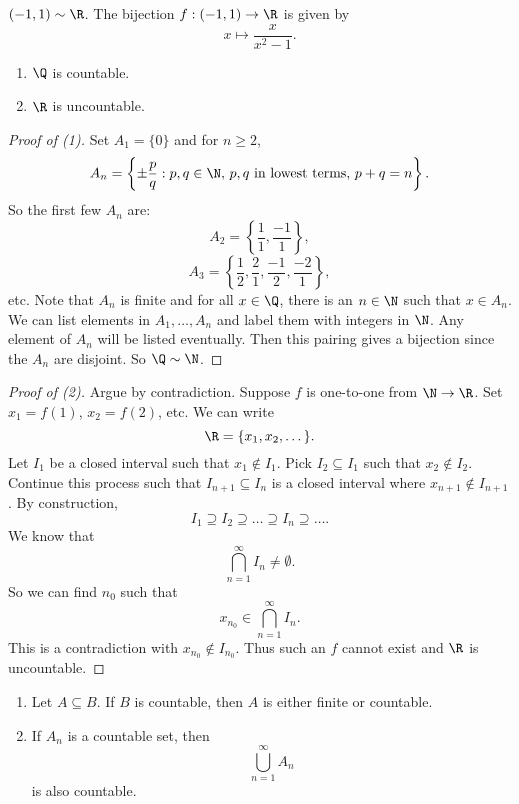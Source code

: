 \begin{example}
  $(-1, 1) \sim \R$.
  The bijection  $f : (-1, 1) \to \R$ is given by
  \[x \mapsto \frac{x}{x^2 - 1}.\]
\end{example}

\begin{theorem}\leavevmode
  \begin{enumerate}
    \item $\Q$ is countable.
    \item  $\R$ is uncountable.
  \end{enumerate}
\end{theorem}

\begin{proof}[Proof of (1)]
  Set $A_1 = \{0\}$ and for $n \ge 2$,
  \[A_n = \left\{\pm \frac{p}{q} : p, q \in \N,\, \text{$p, q$ in lowest terms},\, p + q = n\right\}.\]
  So the first few $A_n$ are:
  \[A_2 = \left\{\frac{1}{1}, \frac{-1}{1}\right\},\]
  \[A_3 = \left\{\frac{1}{2}, \frac{2}{1}, \frac{-1}{2}, \frac{-2}{1}\right\},\]
  etc. Note that $A_n$ is finite and
  for all
  $x \in \Q$, there is an $n \in \N$ such that
  $x \in A_n$.
  We can list elements in $A_1, \dots, A_n$ and label
  them with
  integers in $\N$. Any element of $A_n$ will be
  listed eventually. Then this pairing gives
  a bijection since the $A_n$ are disjoint.
  So $\Q \sim \N$.
\end{proof}

\begin{proof}[Proof of (2)]
  Argue by contradiction. Suppose $f$ is one-to-one from
  $\N \to \R$.
  Set $x_1 = f(1)$, $x_2 = f(2)$, etc. We can write
  \[\R = \{x_1, x_2, \dots\}.\]
  Let $I_1$ be a closed interval such that
  $x_1 \notin I_1$. Pick $I_2 \subseteq I_1$ such that
  $x_2 \notin I_2$. Continue this process such that
  $I_{n+1} \subseteq I_n$ is a closed interval where
  $x_{n+1} \notin I_{n+1}$.
  By construction,
  \[I_1 \supseteq I_2 \supseteq \dots \supseteq I_n \supseteq \dots.\]
  We know that
  \[\bigcap_{n = 1}^\infty I_n \ne \emptyset.\]
  So we can find $n_0$ such that
  \[x_{n_0} \in \bigcap_{n = 1}^\infty I_n.\]
  This is a contradiction with $x_{n_0} \notin I_{n_0}$.
  Thus such an $f$ cannot exist and $\R$ is
  uncountable.
\end{proof}

\begin{theorem}\leavevmode
  \begin{enumerate}
    \item Let $A \subseteq B$. If $B$ is countable, then
      $A$ is either finite or countable.
    \item If $A_n$ is a countable set, then
      \[\bigcup_{n=1}^\infty A_n\]
      is also countable.
  \end{enumerate}
\end{theorem}

